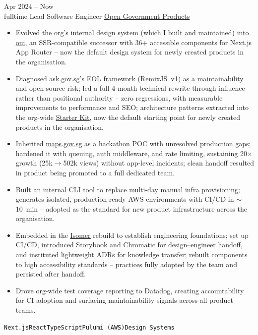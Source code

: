 \documentclass[9pt]{developercv} %
\begin{document}
\begin{entrylist}
	\entry
		{Apr 2024 -- Now\\\footnotesize{fulltime}}
		{Lead Software Engineer}
		{\href{https://open.gov.sg}{Open Government Products}}
		{
			\begin{itemize}[noitemsep, leftmargin=1.25em]
				\item Evolved the org's internal design system (which I built and maintained) into \underline{\href{https://oui.open.gov.sg}{oui}}, an SSR-compatible successor with 36+ accessible components for Next.js App Router -- now the default design system for newly created products in the organisation.
				\item Diagnosed \underline{\href{https://ask.gov.sg}{ask.gov.sg}}'s EOL framework (RemixJS~v1) as a maintainability and open-source risk; led a full 4-month technical rewrite through influence rather than positional authority -- zero regressions, with measurable improvements to performance and SEO; architecture patterns extracted into the org-wide \underline{\href{https://github.com/opengovsg/starter-kit}{Starter Kit}}, now the default starting point for newly created products in the organisation.
				\item Inherited \underline{\href{https://maps.gov.sg}{maps.gov.sg}} as a hackathon POC with unresolved production gaps; hardened it with queuing, auth middleware, and rate limiting, sustaining 20$\times$ growth (25k$\to$502k views) without app-level incidents; clean handoff resulted in product being promoted to a full dedicated team.
				\item Built an internal CLI tool to replace multi-day manual infra provisioning; generates isolated, production-ready AWS environments with CI/CD in $\sim$10~min -- adopted as the standard for new product infrastructure across the organisation.
				\item Embedded in the \underline{\href{https://github.com/opengovsg/isomer}{Isomer}} rebuild to establish engineering foundations; set up CI/CD, introduced Storybook and Chromatic for design--engineer handoff, and instituted lightweight ADRs for knowledge transfer; rebuilt components to high accessibility standards -- practices fully adopted by the team and persisted after handoff.
				\item Drove org-wide test coverage reporting to Datadog, creating accountability for CI adoption and surfacing maintainability signals across all product teams.
			\end{itemize}
		\texttt{Next.js}\slashsep\texttt{React}\slashsep\texttt{TypeScript}\slashsep\texttt{Pulumi (AWS)}\slashsep\texttt{Design Systems}}

\end{entrylist}
\end{document}
